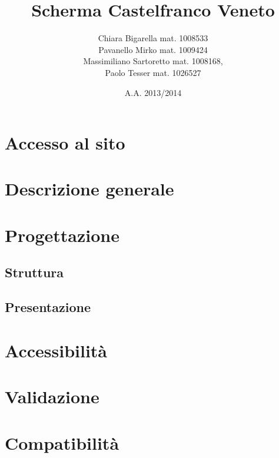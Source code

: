
	
\title{\bfseries Scherma Castelfranco Veneto}
\author{Chiara Bigarella mat. 1008533\\Pavanello Mirko mat. 1009424 \\Massimiliano Sartoretto mat. 1008168,\\ Paolo Tesser mat. 1026527}
\date{A.A. 2013/2014}



\pagestyle{romano}
\newpage
	\tableofcontents
	\listoffigures
\newpage
{}
\pagestyle{std}


\newpage
\section{Accesso al sito}
	

\section{Descrizione generale}
	
	
\newpage
\section{Progettazione}
	\subsection{Struttura}
		
	\subsection{Presentazione}
		
\newpage
\section{Accessibilit\`a}
		

\newpage
\section{Validazione}
		

\newpage
\section{Compatibilit\`a}
	

